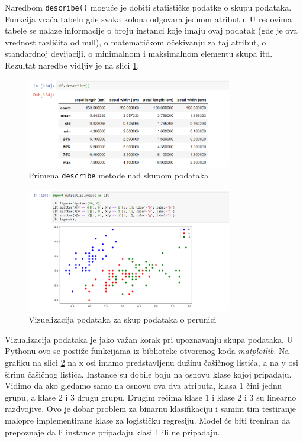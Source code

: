\documentclass[a4paper,12pt]{report}
\begin{document}
Naredbom \texttt{describe()} moguće je dobiti statističke podatke o skupu podataka. Funkcija vraća tabelu gde svaka kolona odgovara jednom atributu. U redovima tabele se nalaze informacije o broju instanci koje imaju ovaj podatak (gde je ova vrednost različita od null), o matematičkom očekivanju za taj atribut, o standardnoj devijaciji, o minimalnom i maksimalnom elementu skupa itd. Rezultat naredbe vidljiv je na slici \ref{fig:irisdescribe}.
\begin{figure}[h]
    \centering
    \includegraphics[width=0.8\textwidth]{iris_describe.png}
    \caption{Primena \texttt{describe} metode nad skupom podataka}\label{fig:irisdescribe}
\end{figure}

\begin{figure}[h]
    \centering
    \includegraphics[width=0.8\textwidth]{iris_3_scatter.png}
    \caption{Vizuelizacija podataka za skup podataka o perunici}\label{fig:irisscatter}
\end{figure}

Vizualizacija podataka je jako važan korak pri upoznavanju skupa podataka. U Pythonu ovo se postiže funkcijama iz biblioteke otvorenog koda \textit{matplotlib}. Na grafiku na slici \ref{fig:irisscatter} na x osi imamo predstavljenu dužinu čašičnog listića, a na y osi širinu čašičnog listića. Instance su dobile boju na osnovu klase kojoj pripadaju. Vidimo da ako gledamo samo na osnovu ova dva atributa, klasa 1 čini jednu grupu, a klase 2 i 3 drugu grupu. Drugim rečima klase 1 i klase 2 i 3 su linearno razdvojive. Ovo je dobar problem za binarnu klasifikaciju i samim tim testiranje malopre implementirane klase za logističku regresiju. Model će biti treniran da prepoznaje da li instance pripadaju klasi 1 ili ne pripadaju. \\
\end{document}
